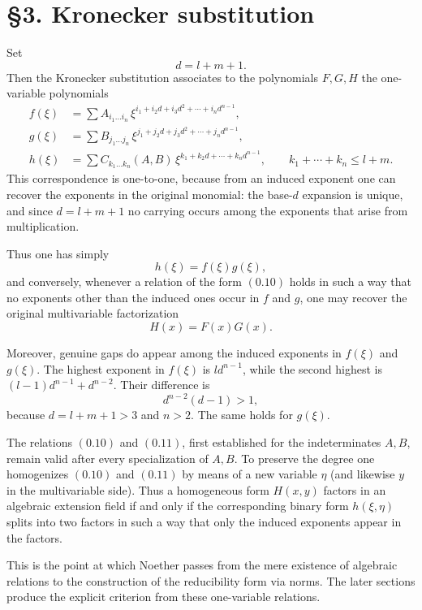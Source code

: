\documentclass[11pt]{article}
\begin{document}
\section*{\S 3. Kronecker substitution}

Set
\[
d=l+m+1.
\tag{0.6}
\]
Then the Kronecker substitution associates to the polynomials $F,G,H$ the one-variable polynomials
\begin{align}
f(\xi) &= \sum A_{i_1\dots i_n}\,\xi^{i_1+i_2d+i_3d^2+\cdots+i_nd^{n-1}}, \tag{0.7}\\
g(\xi) &= \sum B_{j_1\dots j_n}\,\xi^{j_1+j_2d+j_3d^2+\cdots+j_nd^{n-1}}, \tag{0.8}\\
h(\xi) &= \sum C_{k_1\dots k_n}(A,B)\,\xi^{k_1+k_2d+\cdots+k_nd^{n-1}},
\qquad k_1+\cdots+k_n\le l+m. \tag{0.9}
\end{align}
This correspondence is one-to-one, because from an induced exponent one can recover the exponents in the original monomial: the base-$d$ expansion is unique, and since $d=l+m+1$ no carrying occurs among the exponents that arise from multiplication.

Thus one has simply
\[
h(\xi)=f(\xi)g(\xi),
\tag{0.10}
\]
and conversely, whenever a relation of the form \((0.10)\) holds in such a way that no exponents other than the induced ones occur in $f$ and $g$, one may recover the original multivariable factorization
\[
H(x)=F(x)G(x).
\tag{0.11}
\]

Moreover, genuine gaps do appear among the induced exponents in $f(\xi)$ and $g(\xi)$. The highest exponent in $f(\xi)$ is $l d^{n-1}$, while the second highest is $(l-1)d^{n-1}+d^{n-2}$. Their difference is
\[
d^{n-2}(d-1)>1,
\]
because $d=l+m+1>3$ and $n>2$. The same holds for $g(\xi)$.

The relations \((0.10)\) and \((0.11)\), first established for the indeterminates $A,B$, remain valid after every specialization of $A,B$. To preserve the degree one homogenizes \((0.10)\) and \((0.11)\) by means of a new variable $\eta$ (and likewise $y$ in the multivariable side). Thus a homogeneous form $H(x,y)$ factors in an algebraic extension field if and only if the corresponding binary form $h(\xi,\eta)$ splits into two factors in such a way that only the induced exponents appear in the factors.

This is the point at which Noether passes from the mere existence of algebraic relations to the construction of the reducibility form via norms. The later sections produce the explicit criterion from these one-variable relations.
\end{document}
